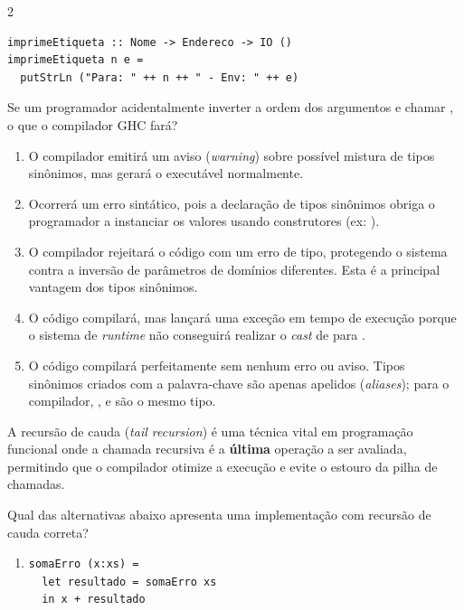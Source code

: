 \documentclass[a4paper,10pt,brazil]{article}
\begin{document}
\begin{multicols}{2}
\begin{verbatim}
imprimeEtiqueta :: Nome -> Endereco -> IO ()
imprimeEtiqueta n e =
  putStrLn ("Para: " ++ n ++ " - Env: " ++ e)
\end{verbatim}

Se um programador acidentalmente inverter a ordem dos argumentos e chamar , o que o compilador GHC fará?

\begin{enumerate}
  \item O compilador emitirá um aviso (\emph{warning}) sobre possível mistura de tipos sinônimos, mas gerará o executável normalmente.

  \item Ocorrerá um erro sintático, pois a declaração de tipos sinônimos obriga o programador a instanciar os valores usando construtores (ex: ).

  \item O compilador rejeitará o código com um erro de tipo, protegendo o sistema contra a inversão de parâmetros de domínios diferentes. Esta é a principal vantagem dos tipos sinônimos.

  \item O código compilará, mas lançará uma exceção em tempo de execução porque o sistema de \emph{runtime} não conseguirá realizar o \emph{cast} de  para .

  \item O código compilará perfeitamente sem nenhum erro ou aviso. Tipos sinônimos criados com a palavra-chave  são apenas apelidos (\emph{aliases}); para o compilador, ,  e  são o mesmo tipo.


\end{enumerate}

A recursão de cauda (\emph{tail recursion}) é uma técnica vital em programação funcional onde a chamada recursiva é a \textbf{última} operação a ser avaliada, permitindo que o compilador otimize a execução e evite o estouro da pilha de chamadas. 

Qual das alternativas abaixo apresenta uma implementação com recursão de cauda correta?

\begin{enumerate}
  \item \begin{verbatim}
somaErro (x:xs) = 
  let resultado = somaErro xs 
  in x + resultado
\end{verbatim}


\end{enumerate}
\end{multicols}
\end{document}
